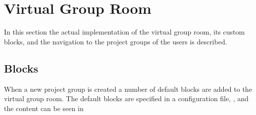 \section{Virtual Group Room} %
\label{sec:projGroupRoomImpl}
In this section the actual implementation of the virtual group room, its custom blocks, and the navigation to the project groups of the users is described. %





\subsection{Blocks}
\label{sec:implprojectgroupblocks}
\label{sub:membersblock}
When a new project group is created a number of default blocks are added to the virtual group room. 
The default blocks are specified in a configuration file, , and the content can be seen in 


